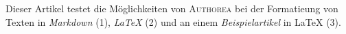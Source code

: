 Dieser Artikel testet die Möglichkeiten von \textsc{Authorea} bei der Formatieung von Texten in \emph{Markdown} (1), \emph{LaTeX} (2) und an einem \textit{Beispielartikel} in LaTeX (3).
